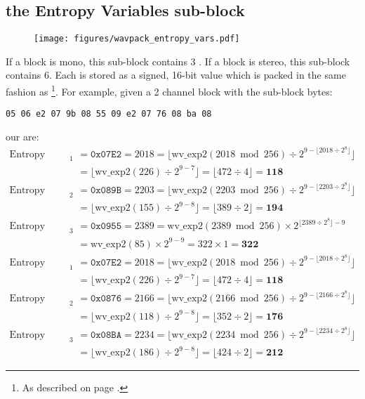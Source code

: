\clearpage

\subsection{the Entropy Variables sub-block}
\begin{figure}[h]
\texttt{[image: figures/wavpack\_entropy\_vars.pdf]}
\end{figure}
\par
\noindent
If a block is mono, this sub-block contains 3 .
If a block is stereo, this sub-block contains 6.
Each is stored as a signed, 16-bit value which is packed in
the same fashion as \footnote{As described
on page \pageref{wavpack_decorr_samples}.}.
For example, given a 2 channel block with the sub-block bytes:
\begin{Verbatim}[frame=single]
05 06 e2 07 9b 08 55 09 e2 07 76 08 ba 08
\end{Verbatim}
our  are:
\begin{align*}
\text{Entropy Variable A}_1 &= \texttt{0x07E2} = 2018 = \lfloor \text{wv\_exp2}(2018 \bmod{256}) \div 2 ^ {9 - \lfloor 2018 \div 2 ^ 8 \rfloor} \rfloor \\
&= \lfloor \text{wv\_exp2}(226) \div 2 ^ {9 - 7} \rfloor
 = \lfloor 472 \div 4 \rfloor = \textbf{118} \\
\text{Entropy Variable A}_2 &= \texttt{0x089B} = 2203 = \lfloor \text{wv\_exp2}(2203 \bmod{256}) \div 2 ^ {9 - \lfloor 2203 \div 2 ^ 8 \rfloor} \rfloor \\
&= \lfloor \text{wv\_exp2}(155) \div 2 ^ {9 - 8} \rfloor
 = \lfloor 389 \div 2 \rfloor = \textbf{194} \\
\text{Entropy Variable A}_3 &= \texttt{0x0955} = 2389 = \text{wv\_exp2}(2389 \bmod{256}) \times 2 ^ {\lfloor 2389 \div 2 ^ 8 \rfloor - 9} \\
&= \text{wv\_exp2}(85) \times 2 ^ {9 - 9} = 322 \times 1 = \textbf{322} \\
\text{Entropy Variable B}_1 &= \texttt{0x07E2} = 2018 = \lfloor \text{wv\_exp2}(2018 \bmod{256}) \div 2 ^ {9 - \lfloor 2018 \div 2 ^ 8 \rfloor} \rfloor \\
&= \lfloor \text{wv\_exp2}(226) \div 2 ^ {9 - 7} \rfloor
 = \lfloor 472 \div 4 \rfloor = \textbf{118} \\
\text{Entropy Variable B}_2 &= \texttt{0x0876} = 2166 = \lfloor \text{wv\_exp2}(2166 \bmod{256}) \div 2 ^ {9 - \lfloor 2166 \div 2 ^ 8 \rfloor} \rfloor \\
&= \lfloor \text{wv\_exp2}(118) \div 2 ^ {9 - 8} \rfloor = \lfloor 352 \div 2 \rfloor = \textbf{176} \\
\text{Entropy Variable B}_3 &= \texttt{0x08BA} = 2234 = \lfloor \text{wv\_exp2}(2234 \bmod{256}) \div 2 ^ {9 - \lfloor 2234 \div 2 ^ 8 \rfloor} \rfloor \\
&= \lfloor \text{wv\_exp2}(186) \div 2 ^ {9 - 8} \rfloor
 = \lfloor 424 \div 2 \rfloor = \textbf{212}
\end{align*}

